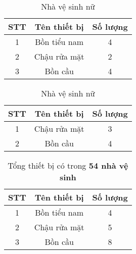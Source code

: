 \begin{table}[H]
	\vspace{-0.25cm}
	\centering
	\begin{minipage}[t]{.5\textwidth}
		\centering
		\caption{Nhà vệ sinh nam} 
		\begin{tabular}{|c|c|c|}
    	\hline
    	\multicolumn{1}{|c|}{\textbf{STT}} & \multicolumn{1}{c|}{\textbf{Tên thiết bị}} & \multicolumn{1}{c|}{\textbf{Số lượng}} \\
    	\hline
    	1     & Bồn tiểu nam & 4 \\
    	\hline
    	2     & Chậu rửa mặt & 2 \\
    	\hline
    	3     & Bồn cầu & 4 \\
    	\hline
    	\end{tabular} 	
  		\label{tab:tb_nvs_nam}
	\end{minipage}
	\hspace{-0.5cm}
	\begin{minipage}[t]{.5\textwidth}
		\centering
		\caption{Nhà vệ sinh nữ}
		\begin{tabular}{|c|c|c|}
    	\hline
    	\multicolumn{1}{|c|}{\textbf{STT}} & \multicolumn{1}{c|}{\textbf{Tên thiết bị}} & \multicolumn{1}{c|}{\textbf{Số lượng}} \\
    	\hline
    	1     & Chậu rửa mặt & 3 \\
    	\hline
    	2     & Bồn cầu & 4 \\
    	\hline
    	\end{tabular}
  		\label{tab:tb_nvs_nữ}	
	\end{minipage}		
\end{table}
	
\begin{table}[H]
		\vspace{-0.5cm}
  		\centering
  		\caption{Tổng thiết bị có trong \textbf{54 nhà vệ sinh}}
    	\begin{tabular}{|c|c|c|}
    	\hline
    	\multicolumn{1}{|c|}{\textbf{STT}} & \multicolumn{1}{c|}{\textbf{Tên thiết bị}} & \multicolumn{1}{c|}{\textbf{Số lượng}} \\
    	\hline
    	1     & Bồn tiểu nam & 4 \\
    	\hline
    	2     & Chậu rửa mặt & 5 \\
    	\hline
    	3     & Bồn cầu & 8 \\
   	 	\hline
    	\end{tabular}%
  		\label{tab:total_equipment_toilet}
\end{table}
		

